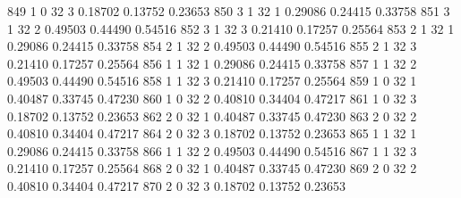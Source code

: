 \documentclass{article}
\begin{document}
\begin{Woutput}
 849      1       0      32       3       0.18702    0.13752    0.23653
 850      3       1      32       1       0.29086    0.24415    0.33758
 851      3       1      32       2       0.49503    0.44490    0.54516
 852      3       1      32       3       0.21410    0.17257    0.25564
 853      2       1      32       1       0.29086    0.24415    0.33758
 854      2       1      32       2       0.49503    0.44490    0.54516
 855      2       1      32       3       0.21410    0.17257    0.25564
 856      1       1      32       1       0.29086    0.24415    0.33758
 857      1       1      32       2       0.49503    0.44490    0.54516
 858      1       1      32       3       0.21410    0.17257    0.25564
 859      1       0      32       1       0.40487    0.33745    0.47230
 860      1       0      32       2       0.40810    0.34404    0.47217
 861      1       0      32       3       0.18702    0.13752    0.23653
 862      2       0      32       1       0.40487    0.33745    0.47230
 863      2       0      32       2       0.40810    0.34404    0.47217
 864      2       0      32       3       0.18702    0.13752    0.23653
 865      1       1      32       1       0.29086    0.24415    0.33758
 866      1       1      32       2       0.49503    0.44490    0.54516
 867      1       1      32       3       0.21410    0.17257    0.25564
 868      2       0      32       1       0.40487    0.33745    0.47230
 869      2       0      32       2       0.40810    0.34404    0.47217
 870      2       0      32       3       0.18702    0.13752    0.23653


\end{Woutput}
\end{document}
